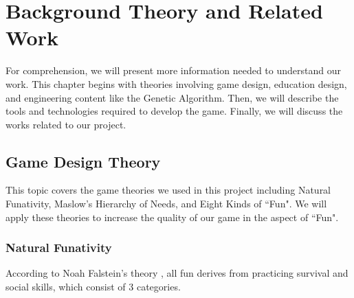 \documentclass[12pt,oneside,openright,a4paper]{cpe-english-project}
\begin{document}
\chapter{Background Theory and Related Work}
\hspace{2em}For comprehension, we will present more information needed to understand our work. This chapter begins with theories involving game design, education design, and engineering content like the Genetic Algorithm. Then, we will describe the tools and technologies required to develop the game. Finally, we will discuss the works related to our project.



\section{Game Design Theory}
This topic covers the game theories we used in this project including Natural Funativity, Maslow's Hierarchy of Needs, and Eight Kinds of ``Fun". We will apply these theories to increase the quality of our game in the aspect of ``Fun".

\subsection{Natural Funativity}
According to Noah Falstein's theory \cite{steve2005introduction}, all fun derives from practicing survival and social skills, which consist of 3 categories.
\end{document}

